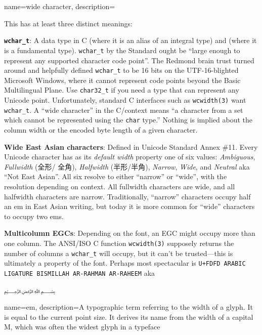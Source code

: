 {
  name={wide character},
  description={This has at least three distinct meanings:
\begin{denseitemize}
\item \textbf{\texttt{wchar\_t}}: A data type in C (where it is an alias of an integral
  type) and \CC (where it is a fundamental type). \texttt{wchar\_t} by the
  Standard ought be ``large enough to represent any supported character code
  point''. The Redmond brain trust turned around and helpfully defined
  \texttt{wchar\_t} to be 16 bits on the UTF-16-blighted Microsoft Windows,
  where it cannot represent code points beyond the Basic Multilingual Plane.
  Use \texttt{char32\_t} if you need a type that can represent any Unicode
  point. Unfortunately, standard C interfaces such as \texttt{wcwidth(3)} want
  \texttt{wchar\_t}. A ``wide character'' in the C/\CC context means ``a character
  from a set which cannot be represented using the \texttt{char} type.'' Nothing is implied
  about the column width or the encoded byte length of a given character.
\item \textbf{Wide East Asian characters}: Defined in Unicode Standard Annex \#11.
    Every Unicode character has as its \textit{default width} property one of
    six values: \textit{Ambiguous}, \textit{Fullwidth} (全形/ 全角),
    \textit{Halfwidth} (半形/半角), \textit{Narrow}, \textit{Wide}, and \textit{Neutral}
    aka ``Not East Asian''. All six resolve to either ``narrow'' or ``wide'', with
    the resolution depending on context. All fullwidth characters are wide, and
    all halfwidth characters are narrow. Traditionally, ``narrow'' characters
    occupy half an \gls{em} in East Asian writing, but today it is more common
    for ``wide'' characters to occupy two ems.
\item \textbf{Multicolumn EGCs}: Depending on the font, an EGC might occupy
  more than one column. The ANSI/ISO C function \texttt{wcwidth(3)} supposely
  returns the number of columns a \texttt{wchar\_t} will occupy, but it can't
  be trusted---this is ultimately a property of the font. Perhaps most
  spectacular is \texttt{U+FDFD ARABIC LIGATURE BISMILLAH AR-RAHMAN AR-RAHEEM}
  aka \begin{arab}[utf]﷽\end{arab}
\end{denseitemize}}
}

{
  name={em},
  description={A typographic term referring to the width of a glyph. It is
    equal to the current point size. It derives its name from the width of a
    capital M, which was often the widest glyph in a typeface}
}

